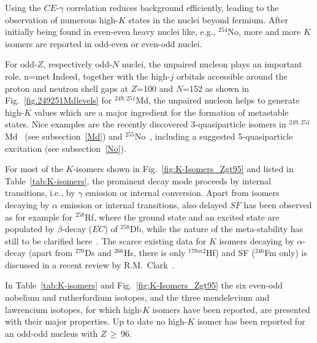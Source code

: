 Using the $CE$-$\gamma$ correlation reduces background efficiently, leading to the observation of numerous high-$K$ states in the nuclei beyond fermium. 
After initially being found in even-even heavy nuclei like, e.g., $^{254}$No, more and more $K$ isomers are reported in odd-even or even-odd nuclei.


For odd-$Z$, respectively odd-$N$ nuclei, the unpaired nucleon plays an important role.  n=met 
Indeed, 
together with the high-$j$ orbitals accessible around the proton and neutron shell gaps at $Z$=100 and $N$=152 as shown in Fig.~\ref{fig.249251Mdlevels} for $^{249,251}$Md, the unpaired nucleon helps to generate high-$K$ values which are a major ingredient for the formation of metastable states.
Nice examples are the recently discovered 3-quasiparticle isomers in $^{249,251}$Md~\cite{Goigoux2021} (see subsection~\ref{Md}) and $^{255}$No~\cite{Bronis2022,Kessaci2024}, including a suggested 5-quasiparticle excitation (see subsection~\ref{No}).

For most of the $K$-isomers shown in Fig.~\ref{fig:K-Isomers_Zgt95} and listed in Table~\ref{tab:K-isomers}, the prominent decay mode proceeds by internal transitions, i.e., by $\gamma$ emission or internal conversion. 
Apart from isomers decaying by $\alpha$ emission or internal transitions, also delayed $SF$ has been observed as for example for $^{258}$Rf, where the ground state and an excited state are populated by $\beta$-decay ($EC$) of $^{258}$Db, while the nature of the meta-stability has still to be clarified here~\cite{Hessberger2016a}. 
The scarce existing data for $K$ isomers decaying by $\alpha$-decay (apart from $^{270}$Ds and $^{266}$Hs, there is only  $^{178m2}$Hf) and SF ($^{246}$Fm only) is discussed in a recent review by R.M.~Clark~\cite{Clark2024}.


In Table~\ref{tab:K-isomers} and Fig.~\ref{fig:K-Isomers_Zgt95} the six even-odd nobelium and rutherfordium isotopes, and the three mendelevium and lawrencium isotopes, for which high-$K$ isomers have been reported, are presented with their major properties.
Up to date no high-$K$ isomer has been reported for an odd-odd nucleus with $Z$\,$\geq$\,96.



